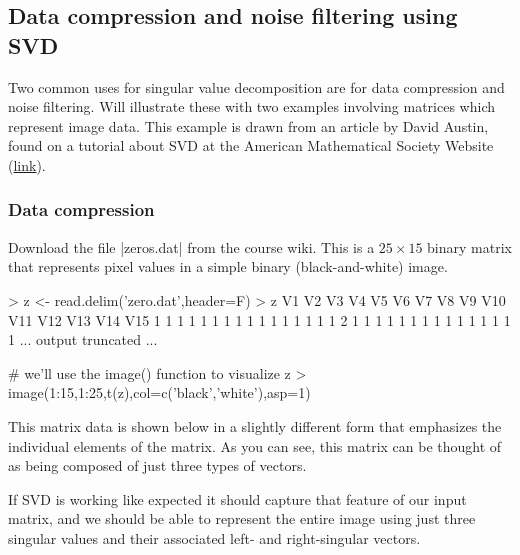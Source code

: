 \subsection*{Data compression and noise filtering using SVD}

Two common uses for singular value decomposition are for data compression and noise filtering. Will illustrate these with two examples involving matrices which represent image data. This example is drawn from an article by David Austin, found on a tutorial about SVD at the American Mathematical Society Website (\href{http://www.ams.org/samplings/feature-column/fcarc-svd}{link}).

\subsubsection*{Data compression}

Download the file |zeros.dat| from the course wiki. This is a $25 \times 15$ binary matrix that represents pixel values in a simple binary (black-and-white) image.

\begin{R}
> z <- read.delim('zero.dat',header=F)
> z
   V1 V2 V3 V4 V5 V6 V7 V8 V9 V10 V11 V12 V13 V14 V15
1   1  1  1  1  1  1  1  1  1   1   1   1   1   1   1
2   1  1  1  1  1  1  1  1  1   1   1   1   1   1   1
... output truncated ...

# we'll use the image() function to visualize z
> image(1:15,1:25,t(z),col=c('black','white'),asp=1)    
\end{R}

This matrix data is shown below in a slightly different form that emphasizes the individual elements of the matrix.  As you can see, this matrix can be thought of as being composed of just three types of vectors.


\begin{figure}[ht!]
\begin{center}
\end{center}
\end{figure}

If SVD is working like expected it should capture that feature of our input matrix, and we should be able to represent the entire image using just three singular values and their associated left- and right-singular vectors.

